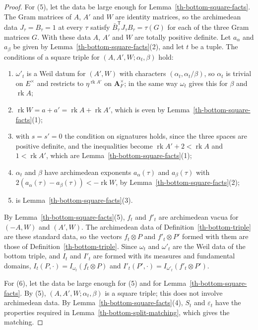 \begin{proof}
For (5), let the data be large enough for Lemma~\ref{th-bottom-square-facts}.
The Gram matrices of $A$, $A'$ and $W$ are identity matrices, so the
archimedean data $J_\tau=B_\tau=1$ at every $\tau$ satisfy
$\bar B_\tau^{\mathsf T}J_\tau B_\tau=\tau(G)$ for each of the three Gram
matrices $G$. With these data $A$, $A'$ and $W$ are totally positive definite.
Let $a_\alpha$ and $a_\beta$ be given by Lemma~\ref{th-bottom-square-facts}(2),
and let $t$ be a tuple. The conditions of a square triple for
$(A,A',W;\alpha_t,\beta)$ hold:
\begin{enumerate}
\item[(a)] $\omega'_t$ is a Weil datum for $(A',W)$ with characters
  $(\alpha_t,\alpha_t/\beta)$, so $\alpha_t$ is trivial on $E^\times$ and
  restricts to $\eta^{\operatorname{rk}A'}$ on $\mathbf A_F^\times$; in the same
  way $\omega_t$ gives this for $\beta$ and $\operatorname{rk}A$;
\item[(b)] $\operatorname{rk}W=a+a'=\operatorname{rk}A+\operatorname{rk}A'$,
  which is even by Lemma~\ref{th-bottom-square-facts}(1);
\item[(c)] with $s=s'=0$ the condition on signatures holds, since the three
  spaces are positive definite, and the inequalities become
  $\operatorname{rk}A'+2<\operatorname{rk}A$ and $1<\operatorname{rk}A'$,
  which are Lemma~\ref{th-bottom-square-facts}(1);
\item[(d)] $\alpha_t$ and $\beta$ have archimedean exponents $a_\alpha(\tau)$
  and $a_\beta(\tau)$ with $2(a_\alpha(\tau)-a_\beta(\tau))<-\operatorname{rk}W$,
  by Lemma~\ref{th-bottom-square-facts}(2);
\item[(e)] is Lemma~\ref{th-bottom-square-facts}(3).
\end{enumerate}
By Lemma~\ref{th-bottom-square-facts}(5), $f_t$ and $f'_t$ are archimedean
vacua for $(-A,W)$ and $(A',W)$. The archimedean data of
Definition~\ref{th-bottom-triple} are these standard data, so the vectors
$f_t\otimes P$ and $f'_t\otimes P'$ formed with them are those of
Definition~\ref{th-bottom-triple}. Since $\omega_t$ and $\omega'_t$ are the Weil
data of the bottom triple, and $I_t$ and $I'_t$ are formed with its measures
and fundamental domains, $I_t(P,\cdot)=I_{\omega_t}(f_t\otimes P)$ and
$I'_t(P',\cdot)=I_{\omega'_t}(f'_t\otimes P')$.

For (6), let the data be large enough for (5) and for
Lemma~\ref{th-bottom-square-facts}. By (5), $(A,A',W;\alpha_t,\beta)$ is a
square triple; this does not involve archimedean data. By
Lemma~\ref{th-bottom-square-facts}(4), $S_t$ and $\varepsilon_t$ have the
properties required in Lemma~\ref{th-bottom-split-matching}, which gives the
matching.
\end{proof}

